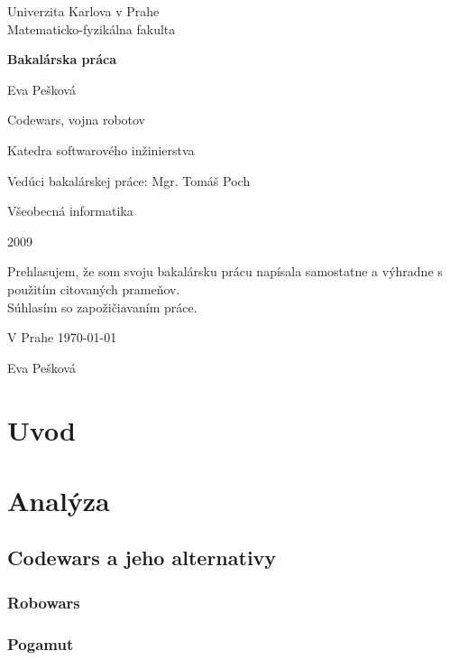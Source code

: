 \documentclass[12pt,notitlepage]{report}
\begin{document}
\begin{titlepage}
\begin{center}
\vspace{1.5in}
{\rm Univerzita Karlova v Prahe\\
    Matematicko-fyzikálna fakulta}
\par
\vspace{0.7in}
{\huge \bf Bakalárska práca}
\par
\vspace{0.5in}
{Eva Pešková}
\par
\vspace{0.5in}
Codewars, vojna robotov
\par
\vfill
Katedra softwarového inžinierstva
\par
\vspace{0.5in}
Vedúci bakalárskej práce: Mgr. Tomáš Poch
\par
\vspace{0.5in}
Všeobecná informatika
\par
\vspace{0.5in}
2009
\end{center}
\end{titlepage}
\vfill
Prehlasujem, že som svoju bakalársku prácu napísala samostatne a výhradne s použitím citovaných prameňov.\\
Súhlasím so zapožičiavaním práce.\\
\par
V Prahe \today
\begin{flushright}
Eva Pešková
\end{flushright}

\newtheorem{definicia}{Značenie}

\tableofcontents
\chapter{Uvod}%
\chapter{Analýza}

\section{Codewars a jeho alternativy}
\subsection {Robowars}
\subsection {Pogamut}
\end{document}
